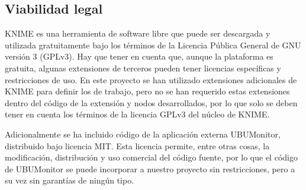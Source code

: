\subsection{Viabilidad legal}

KNIME es una herramienta de software libre que puede ser descargada y utilizada gratuitamente bajo los 
términos de la Licencia Pública General de GNU versión 3 (GPLv3). Hay que tener en cuenta que, aunque la 
plataforma es gratuita, algunas extensiones de terceros pueden tener licencias específicas y 
restricciones de uso. En este proyecto se han utilizado extensiones adicionales de KNIME para 
definir los  de trabajo, pero no se han requerido estas extensiones dentro del código 
de la extensión y nodos desarrollados, por lo que solo se deben tener en cuenta los términos de la
 licencia GPLv3 del núcleo de KNIME. 

Adicionalmente se ha incluido código de la aplicación externa UBUMonitor, distribuido bajo licencia MIT. Esta licencia permite, entre 
otras cosas, la modificación, distribución y uso comercial del código fuente, por lo que el código 
de UBUMonitor se puede incorporar a nuestro proyecto sin restricciones, pero a su vez sin garantías de ningún tipo. 

